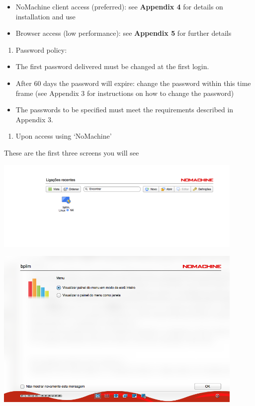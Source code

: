 \documentclass[]{book}
\providecommand{\tightlist}{%
  \setlength{\itemsep}{0pt}\setlength{\parskip}{0pt}}
\begin{document}
\begin{itemize}
\tightlist
\item
  NoMachine client access ({preferred}): see \textbf{Appendix 4} for details on installation and use
\item
  Browser access ({low performance}): see \textbf{Appendix 5} for further details
\end{itemize}

\begin{enumerate}
\def\labelenumi{\arabic{enumi}.}
\setcounter{enumi}{1}
\tightlist
\item
  Password policy:
\end{enumerate}

\begin{itemize}
\tightlist
\item
  The first password delivered must be changed at the first login.
\item
  After 60 days the password will expire: change the password within this time frame (see Appendix 3 for instructions on how to change the password)
\item
  The passwords to be specified must meet the requirements described in Appendix 3.
\end{itemize}

\begin{enumerate}
\def\labelenumi{\arabic{enumi}.}
\setcounter{enumi}{2}
\tightlist
\item
  Upon access using `NoMachine'
\end{enumerate}

These are the first three screens you will see

\includegraphics[width=4.72441in,height=1.72233in]{./media/image1.png}

\includegraphics[width=4.72441in,height=3.05928in]{./media/image2.png}
\end{document}
